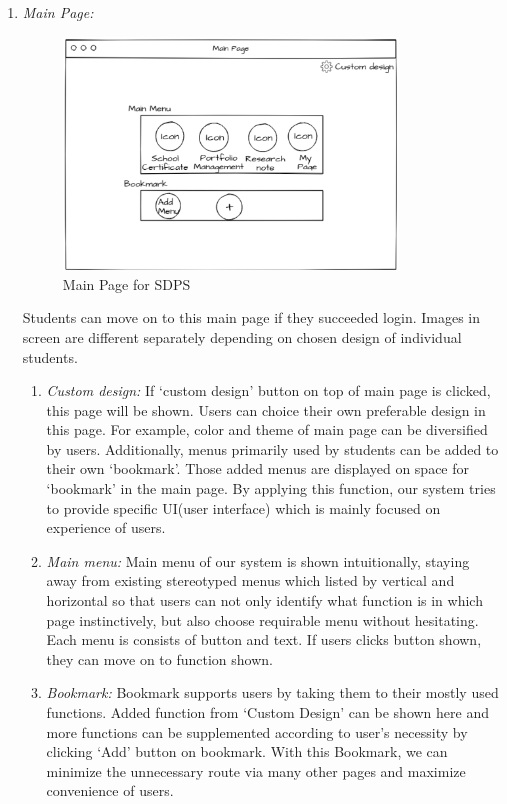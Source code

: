 \documentclass[conference]{IEEEtran}
\begin{document}
\begin{enumerate}
    \item \textit {Main Page: }
    \begin{figure}[htbp]
	\centerline{\includegraphics[width=89mm,scale=0.5]{student/mainpage.png}}
	\caption{Main Page for SDPS}
	\label{fig}
	\end{figure}
    
    Students can move on to this main page if they succeeded login. Images in screen are different separately depending on chosen design of individual students. \\
    \begin{enumerate}
    	\item \textit{Custom design:} If ‘custom design’ button on top of main page is clicked, this page will be shown. Users can choice their own preferable design in this page. For example, color and theme of main page can be diversified by users. Additionally, menus primarily used by students can be added to their own  ‘bookmark’. Those added menus are displayed on space for ‘bookmark’ in the main page. By applying this function, our system tries to provide specific UI(user interface) which is mainly focused on experience of users.\\
        \item \textit{Main menu:} Main menu of our system is shown intuitionally, staying away from existing stereotyped menus which listed by vertical and horizontal so that users can not only identify what function is in which page instinctively, but also choose requirable menu without hesitating. Each menu is consists of button and text. If users clicks button shown, they can move on to function shown. \\
        \item \textit{Bookmark:} Bookmark supports users by taking them to their mostly used functions. Added function from ‘Custom Design’ can be shown here and more functions can be supplemented according to user’s necessity by clicking ‘Add’ button on bookmark. With this Bookmark, we can minimize the unnecessary route via many other pages and maximize convenience of users. \\
    \end{enumerate}
    

\end{enumerate}
\end{document}
